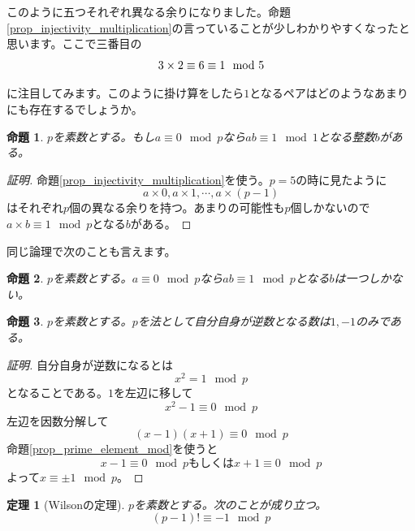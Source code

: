 \documentclass{ltjsarticle}
\newtheorem{theorem}{定理}[section]
\newtheorem{proposition}{命題}[section]
\begin{document}
このように五つそれぞれ異なる余りになりました。命題\ref{prop_injectivity_multiplication}の言っていることが少しわかりやすくなったと思います。ここで三番目の
\begin{equation*}
3\times 2 \equiv 6\equiv 1 \mod{5}\\
\end{equation*}

に注目してみます。このように掛け算をしたら$1$となるペアはどのようなあまりにも存在するでしょうか。
\begin{proposition}
$p$を素数とする。もし$a\equiv0\mod{p}$なら$ab\equiv1\mod{1}$となる整数$b$がある。
\end{proposition}
\begin{proof}[証明]
命題\ref{prop_injectivity_multiplication}を使う。$p=5$の時に見たように
\begin{equation*}
a\times 0,a\times 1,\cdots,a\times (p-1)
\end{equation*}
はそれぞれ$p$個の異なる余りを持つ。あまりの可能性も$p$個しかないので$a\times b\equiv1\mod{p}$となる$b$がある。
\end{proof}
同じ論理で次のことも言えます。
\begin{proposition}
$p$を素数とする。$a\equiv0\mod{p}$なら$ab\equiv1\mod{p}$となる$b$は一つしかない。
\end{proposition}
\begin{proposition}
$p$を素数とする。$p$を法として自分自身が逆数となる数は$1,-1$のみである。
\end{proposition}
\begin{proof}[証明]
自分自身が逆数になるとは
\begin{equation*}
x^2=1\mod{p}
\end{equation*}
となることである。$1$を左辺に移して
\begin{equation*}
x^2-1\equiv 0\mod{p}
\end{equation*}
左辺を因数分解して
\begin{equation*}
(x-1)(x+1)\equiv 0\mod{p}
\end{equation*}
命題\ref{prop_prime_element_mod}を使うと
\begin{equation*}
x-1\equiv0\mod{p}\text{もしくは}x+1\equiv 0\mod{p}
\end{equation*}
よって$x\equiv\pm1\mod{p}$。
\end{proof}
\begin{theorem}[Wilsonの定理]
$p$を素数とする。次のことが成り立つ。
\begin{equation*}
(p-1)!\equiv -1\mod{p}
\end{equation*}
\end{theorem}
\end{document}
